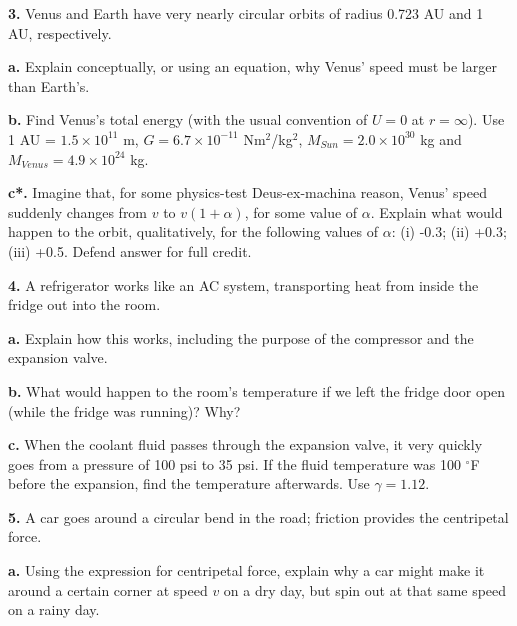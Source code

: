 \documentclass[12pt]{article}
\begin{document}
\bigskip

\textbf{3.} Venus and Earth have very nearly circular orbits of radius 0.723 AU and 1 AU, respectively.

\textbf{a.} Explain conceptually, or using an equation, why Venus' speed must be larger than Earth's. 

\textbf{b.} Find Venus's total energy (with the usual convention of $U=0$ at $r=\infty$). Use 1 AU = $1.5 \times 10^{11}$ m, $G=6.7 \times 10^{-11}$ Nm$^2$/kg$^2$, $M_{Sun}=2.0 \times 10^{30}$ kg and $M_{Venus}=4.9 \times 10^{24}$ kg.

\textbf{c*.} Imagine that, for some physics-test Deus-ex-machina reason, Venus' speed suddenly changes from $v$ to $v(1+\alpha)$, for some value of $\alpha$. Explain what would happen to the orbit, qualitatively, for the following values of $\alpha$: (i) -0.3; (ii) +0.3; (iii) +0.5. Defend answer for full credit.  




\newpage

\textbf{4.} A refrigerator works like an AC system, transporting heat from inside the fridge out into the room. 

\textbf{a.} Explain how this works, including the purpose of the compressor and the expansion valve.

\textbf{b.} What would happen to the room's temperature if we left the fridge door open (while the fridge was running)? Why?

\textbf{c.} When the coolant fluid passes through the expansion valve, it very quickly goes from a pressure of 100 psi to 35 psi. If the fluid temperature was 100 $^{\circ}$F before the expansion, find the temperature afterwards. Use $\gamma=1.12$.

\bigskip

\textbf{5.} A car goes around a circular bend in the road; friction provides the centripetal force.

\textbf{a.} Using the expression for centripetal force, explain why a car might make it around a certain corner at speed $v$ on a dry day, but spin out at that same speed on a rainy day.
\end{document}
